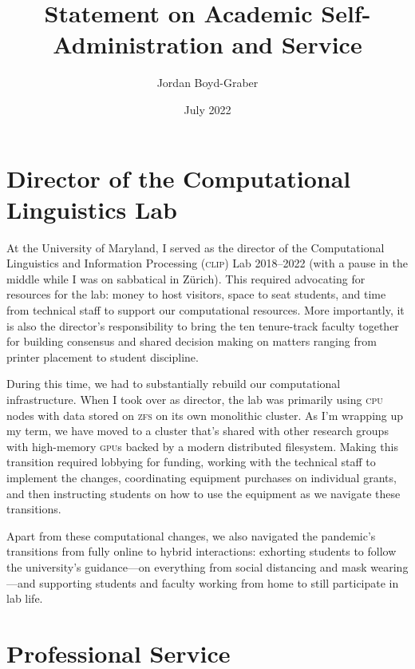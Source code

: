 \documentclass[11pt]{amsart}
\newcommand{\abr}[1]{\textsc{#1}}
\begin{document}
 \title{Statement on Academic Self-Administration and Service}

 \author{Jordan Boyd-Graber}
\address{University of Maryland}

\date{July 2022}


\keywords{}

\maketitle

\section{Director of the Computational Linguistics Lab}

At the University of Maryland, I served as the director of the
Computational Linguistics and Information Processing (\abr{clip}) Lab
2018--2022 (with a pause in the middle while I was on sabbatical in
Z\"urich).
%
This required advocating for resources for the lab: money to host
visitors, space to seat students, and time from technical staff to
support our computational resources.
%
More importantly, it is also the director's responsibility to bring
the ten tenure-track faculty together for building consensus and shared
decision making on matters ranging from printer placement to student
discipline.

During this time, we had to substantially rebuild our computational
infrastructure.
%
When I took over as director, the lab was primarily using \abr{cpu}
nodes with data stored on \abr{zfs} on its own monolithic cluster.
%
As I'm wrapping up my term, we have moved to a cluster that's shared
with other research groups with high-memory \abr{gpu}s backed by a
modern distributed filesystem.
%
Making this transition required lobbying for funding, working with the
technical staff to implement the changes, coordinating equipment
purchases on individual grants, and then instructing students
on how to use the equipment as we navigate these transitions.

Apart from these computational changes, we also navigated the
pandemic's transitions from fully online to hybrid interactions:
exhorting students to follow the university's guidance---on everything
from social distancing and mask wearing---and supporting students and
faculty working from home to still participate in
lab life.

\section{Professional Service}
\end{document}
